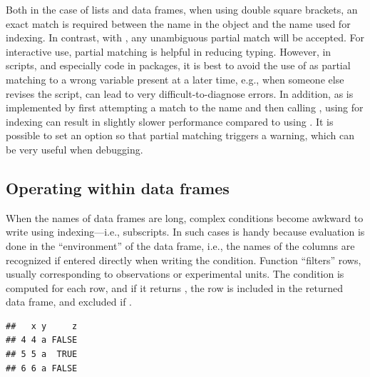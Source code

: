 \documentclass[krantz2]{krantz}\usepackage{knitr}
\begin{document}
\begin{warningbox}
Both in the case of lists and data frames, when using double square brackets, an exact match is required between the name in the object and the name used for indexing. In contrast, with \Roperator{\$}, any unambiguous partial match will be accepted. For interactive use, partial matching is helpful in reducing typing. However, in scripts, and especially \Rlang code in packages, it is best to avoid the use of \Roperator{\$} as partial matching to a wrong variable present at a later time, e.g., when someone else revises the script, can lead to very difficult-to-diagnose errors. In addition, as \Roperator{\$} is implemented by first attempting a match to the name and then calling \Roperator{[[]]}, using \Roperator{\$} for indexing can result in slightly slower performance compared to using \Roperator{[[]]}. It is possible to set an \Rlang option so that partial matching triggers a warning, which can be very useful when debugging.
\end{warningbox}

\subsection{Operating within data frames}\label{sec:calc:df:with}
When the names of data frames are long, complex conditions become awkward to write using indexing---i.e., subscripts. In such cases  is handy because evaluation is done in the ``environment'' of the data frame, i.e., the names of the columns are recognized if entered directly when writing the condition. Function   ``filters'' rows, usually corresponding to observations or experimental units. The condition is computed for each row, and if it returns , the row is included in the returned data frame, and excluded if .

\begin{knitrout}\footnotesize
{}\color{fgcolor}\begin{kframe}
\begin{alltt}
 \hlkwb{<-} \hlstd{(} \hlstd{=} \hlopt{:}\hlstd{,}  \hlstd{=} \hlstd{,}  \hlstd{=} \hlstd{(}\hlstd{,} \hlstd{))}
 \hlopt{>} \hlstd{)}
\end{alltt}
\begin{verbatim}
##   x y     z
## 4 4 a FALSE
## 5 5 a  TRUE
## 6 6 a FALSE
\end{verbatim}
\end{kframe}
\end{knitrout}
\end{document}
